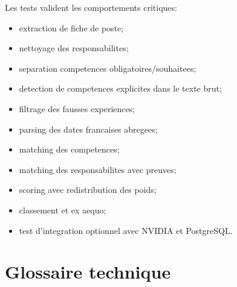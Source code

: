 \documentclass[12pt,a4paper]{article}
\begin{document}
Les tests valident les comportements critiques:

\begin{itemize}
  \item extraction de fiche de poste;
  \item nettoyage des responsabilites;
  \item separation competences obligatoires/souhaitees;
  \item detection de competences explicites dans le texte brut;
  \item filtrage des fausses experiences;
  \item parsing des dates francaises abregees;
  \item matching des competences;
  \item matching des responsabilites avec preuves;
  \item scoring avec redistribution des poids;
  \item classement et ex aequo;
  \item test d'integration optionnel avec NVIDIA et PostgreSQL.
\end{itemize}

\section{Glossaire technique}
\end{document}
